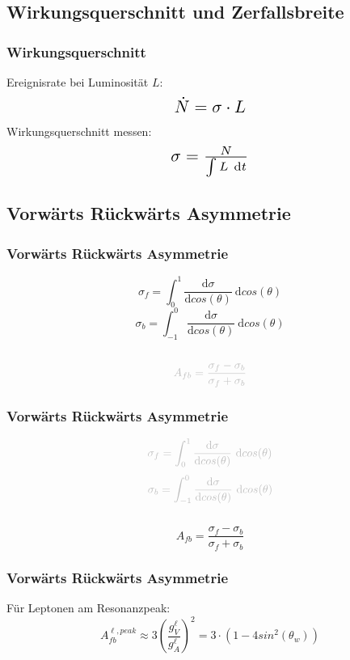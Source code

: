 \subsection{Wirkungsquerschnitt und Zerfallsbreite}
\begin{frame}
	\frametitle{Wirkungsquerschnitt}
	\hspace{1cm} Ereignisrate bei Luminosität $L$:
	\begin{equation*}
	\scalebox{1.5}{$\dot{N} = \sigma \cdot L$}
	\end{equation*}
	\hspace{1cm} Wirkungsquerschnitt messen:
	\begin{equation*}
	\scalebox{1.5}{$\sigma = \frac{N}{\int L~\text{d}t}$}
	\end{equation*}
\end{frame}
\subsection{Vorwärts Rückwärts Asymmetrie}
\begin{frame}
	\frametitle{Vorwärts Rückwärts Asymmetrie}
	\begin{center}
		\begin{equation*}
		\sigma_f=\int_{0}^{1}\frac{\text{d}\sigma}{\text{d}cos(\theta)}~\text{d}cos(\theta)
		\end{equation*}
		\begin{equation*}
		\sigma_b=\int_{-1}^{0}\frac{\text{d}\sigma}{\text{d}cos(\theta)}~\text{d}cos(\theta)
		\end{equation*}
		\\
		\begin{equation*}
		\textcolor{lightgray}{A_{fb}=\frac{\sigma_f-\sigma_b}{\sigma_f+\sigma_b}}
		\end{equation*}
	\end{center}
\end{frame}
\begin{frame}
	\frametitle{Vorwärts Rückwärts Asymmetrie}
	\begin{center}
		\begin{equation*}
		\textcolor{lightgray}{\sigma_f=\int_{0}^{1}\frac{\text{d}\sigma}{\text{d}cos(\theta)}~\text{d}cos(\theta)}
		\end{equation*}
		\begin{equation*}
		\textcolor{lightgray}{\sigma_b=\int_{-1}^{0}\frac{\text{d}\sigma}{\text{d}cos(\theta)}~\text{d}cos(\theta)}
		\end{equation*}
		\\
		\begin{equation*}
		A_{fb}=\frac{\sigma_f-\sigma_b}{\sigma_f+\sigma_b}
		\end{equation*}
	\end{center}
\end{frame}
\begin{frame}
	\frametitle{Vorwärts Rückwärts Asymmetrie}
	\begin{center}
		Für Leptonen am Resonanzpeak:
		\begin{equation*}
		A_{fb}^{\ell,peak}\approx 3 \left ( \frac{g^{\ell}_V}{g^{\ell}_A} \right )^2=3\cdot (1-4 sin^2(\theta_w))
		\end{equation*}
	\end{center}
\end{frame}